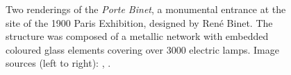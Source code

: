 \documentclass{article}
\begin{document}
\begin{figure}[ht!]
    \centering
    \caption{Two renderings of the \textit{Porte Binet}, a monumental entrance at the site of the 1900 Paris Exhibition, designed by René Binet. The structure was composed of a metallic network with embedded coloured glass elements covering over 3000 electric lamps. \newline Image sources (left to right): \cite{louis_porte_1900}, \cite{binet_projet_1898}.}
    \label{fig:porte_binet}
\end{figure}

\clearpage
\end{document}
